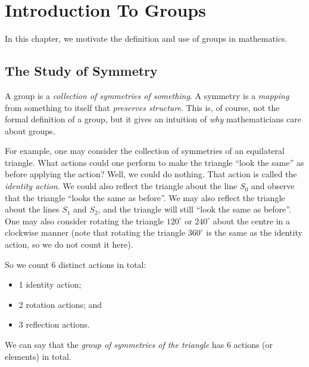 
\frontmatterpages

\chapter{Introduction To Groups}
In this chapter, we motivate the definition and use of groups in mathematics.

\section{The Study of Symmetry}
A group is a \textit{collection of symmetries of something}. A symmetry is a \textit{mapping} from something to itself that \textit{preserves structure}. This is, of course, not the formal definition of a group, but it gives an intuition of \textit{why} mathematicians care about groups.

\begin{figure}
    \centering
\end{figure}

For example, one may consider the collection of symmetries of an equilateral triangle. What actions could one perform to make the triangle ``look the same'' as before applying the action? Well, we could do nothing. That action is called the \textit{identity action}. We could also reflect the triangle about the line $S_0$ and observe that the triangle ``looks the same as before''. We may also reflect the triangle about the lines $S_1$ and $S_2$, and the triangle will still ``look the same as before''. One may also consider rotating the triangle $120^\circ$ or $240^\circ$ about the centre in a clockwise manner (note that rotating the triangle $360^\circ$ is the same as the identity action, so we do not count it here).

\newpage

So we count 6 distinct actions in total:
\begin{itemize}
    \item 1 identity action;
    \item 2 rotation actions; and
    \item 3 reflection actions.
\end{itemize}
We can say that the \textit{group of symmetries of the triangle} has 6 actions (or elements) in total.

